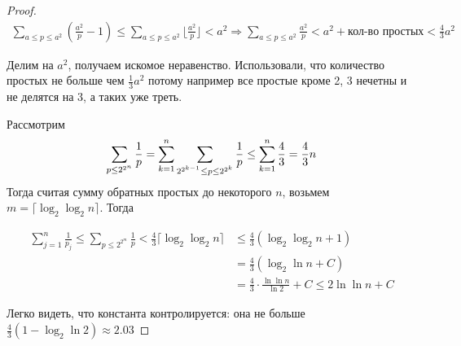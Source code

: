 \begin{enumerate}
\begin{proof}
        \begin{gather*}
            \sum_{a \leq p \leq a^2}(\frac{a^2}{p} - 1) \leqslant \sum_{a \leq p \leq a^2} \lfloor \frac{a^2}{p} \rfloor < a^2
            \Longrightarrow \sum_{a \leq p \leq a^2} \frac{a^2}{p} < a^2 + \text{кол-во простых} < \frac{4}{3}a^2 \
        \end{gather*}

        Делим на $a^2$, получаем искомое неравенство. Использовали, что количество простых не больше чем $\frac{1}{3}a^2$ потому например
        все простые кроме 2, 3 нечетны и не делятся на $3$, а таких уже треть.

        Рассмотрим
        \begin{gather*}
            \sum_{p \leq 2^{2^n}} \frac{1}{p} = \sum \limits_{k=1}^n \sum_{2^{2^{k-1}} \leq p \leq 2^{2^k}} \frac{1}{p}
            \leq \sum \limits_{k=1}^n \frac{4}{3} = \frac{4}{3}n
        \end{gather*}
        Тогда считая сумму обратных простых до некоторого $n$, возьмем $m = \lceil \log_2 \log_2 n \rceil$. Тогда

        \begin{align*}
            \sum_{j=1}^n \frac{1}{p_j} \leqslant \sum_{p \leqslant 2^{2^m}} \frac{1}{p} < \frac{4}{3}\lceil \log_2 \log_2 n \rceil
            &\leqslant \frac{4}{3} (\log_2 \log_2 n + 1) \\
            &= \frac{4}{3}(\log_2 \ln n + C) \\
            &= \frac{4}{3} \cdot \frac{\ln \ln n}{\ln 2} + C \leq 2 \ln \ln n + C
        \end{align*}

        Легко видеть, что константа контролируется: она не больше $\frac{4}{3} (1 - \log_2 \ln 2) \approx 2.03$
    \end{proof}   


\end{enumerate}